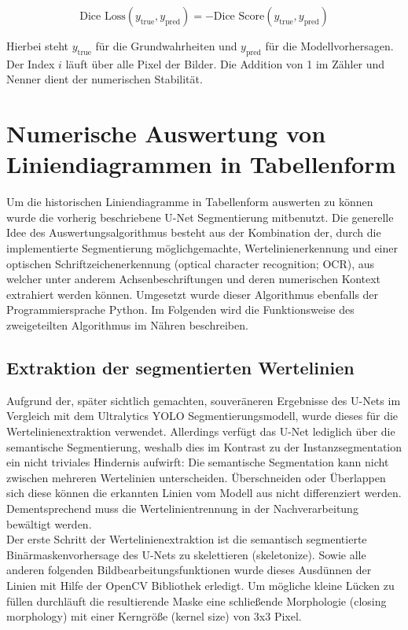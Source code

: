 \begin{equation}
    \text{Dice Loss}(y_{\text{true}}, y_{\text{pred}}) = -\text{Dice Score}(y_{\text{true}}, y_{\text{pred}}) \nonumber
\end{equation}

Hierbei steht $y_{\text{true}}$ für die Grundwahrheiten und $y_{\text{pred}}$ für die Modellvorhersagen. Der Index $i$ läuft über alle Pixel der Bilder. Die Addition von 1 im Zähler und Nenner dient der numerischen Stabilität.


\section{Numerische Auswertung von Liniendiagrammen in Tabellenform}

Um die historischen Liniendiagramme in Tabellenform auswerten zu können wurde die vorherig beschriebene U-Net Segmentierung mitbenutzt. Die generelle Idee des Auswertungsalgorithmus besteht aus der Kombination der, durch die implementierte Segmentierung möglichgemachte, Wertelinienerkennung und einer optischen Schriftzeichenerkennung (optical character recognition; OCR), aus welcher unter anderem Achsenbeschriftungen und deren numerischen Kontext extrahiert werden können. Umgesetzt wurde dieser Algorithmus ebenfalls der Programmiersprache Python. Im Folgenden wird die Funktionsweise des zweigeteilten Algorithmus im Nähren beschreiben.

\subsection{Extraktion der segmentierten Wertelinien}

Aufgrund der, später sichtlich gemachten, souveräneren Ergebnisse des U-Nets im Vergleich mit dem Ultralytics YOLO Segmentierungsmodell, wurde dieses für die Wertelinienextraktion verwendet. Allerdings verfügt das U-Net lediglich über die semantische Segmentierung, weshalb dies im Kontrast zu der Instanzsegmentation ein nicht triviales Hindernis aufwirft: Die semantische Segmentation kann nicht zwischen mehreren Wertelinien unterscheiden. Überschneiden oder Überlappen sich diese können die erkannten Linien vom Modell aus nicht differenziert werden. Dementsprechend muss die Wertelinientrennung in der Nachverarbeitung bewältigt werden.
\\
Der erste Schritt der Wertelinienextraktion ist die semantisch segmentierte Binärmaskenvorhersage des U-Nets zu skelettieren (skeletonize). Sowie alle anderen folgenden Bildbearbeitungsfunktionen wurde dieses Ausdünnen der Linien mit Hilfe der OpenCV Bibliothek erledigt. Um mögliche kleine Lücken zu füllen durchläuft die resultierende Maske eine schließende Morphologie (closing morphology) mit einer Kerngröße (kernel size) von 3x3 Pixel.


